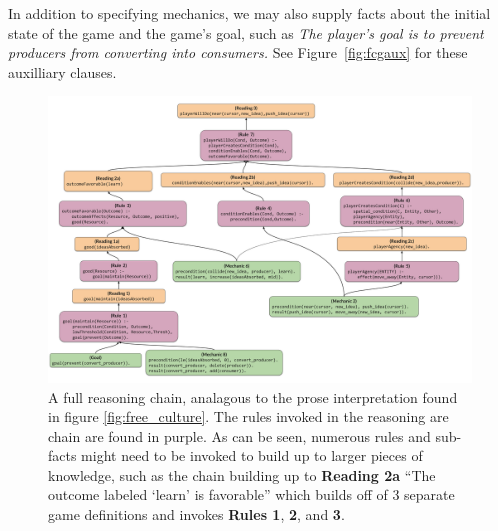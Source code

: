 \documentclass[a4paper]{article}
\begin{document}
In addition to specifying mechanics, we may also supply facts about the
initial state of the game and the game's goal, such as {\em The player's
goal is to prevent producers from converting into consumers.}
See Figure~\ref{fig:fcgaux} for these auxilliary clauses.
\begin{figure}[h]
\centering
\includegraphics[width=1\textwidth]{figures/-Proceduralist_Reading_-_CODE.pdf}%
\caption{A full reasoning chain, analagous to the prose interpretation found in figure \ref{fig:free_culture}.  The rules invoked in the reasoning are chain are found in purple.  As can be seen, numerous rules and sub-facts might need to be invoked to build up to larger pieces of knowledge, such as the chain building up to \textbf{Reading 2a} ``The outcome labeled `learn' is favorable'' which builds off of 3 separate game definitions and invokes \textbf{Rules 1}, \textbf{2}, and \textbf{3}.}
\label{fig:proc_reading_code}
\end{figure}




\end{document}
